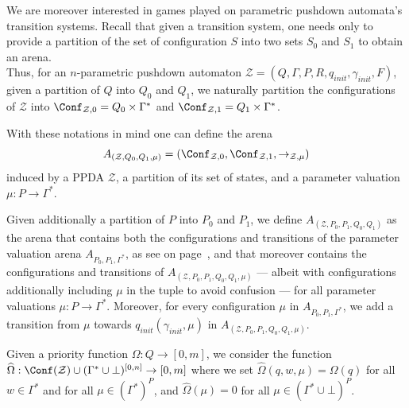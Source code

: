 We are moreover interested in games played on parametric pushdown automata's  
 transition systems.
Recall that given a 
transition system,
one needs only to provide %
a partition of the set of configuration $S$ into two sets $S_0$ and $S_1$ to obtain an arena. \\


Thus, for an  $n$-parametric pushdown automaton 
$\mathcal{Z}= (Q, \Gamma, P, R, q_{init}, \gamma_{init},F)$,
given a partition of
$Q$ into $Q_0$ and $Q_1$, 
we naturally partition the configurations of
 $\mathcal{Z}$
into
$\Conf_{\mathcal{Z},0}=Q_0\times \Gamma^*$
and
$\Conf_{\mathcal{Z},1}=Q_1\times \Gamma^*$. 


With these notations in mind one can define the arena
$$
A_{(\mathcal{Z}, Q_0, Q_1, \mu)}
=
(\Conf_{\mathcal{Z},0}, \Conf_{\mathcal{Z},1}, \rightarrow_{\mathcal{Z},\mu})$$
induced by a PPDA $\mathcal{Z}$, a partition of its set of states, and a
parameter valuation $\mu: P\rightarrow \Gamma^*$.



Given additionally a partition of
$P$ into $P_0$ and $P_1$, 
we define 
$A_{(\mathcal{Z}, P_0, P_1, Q_0 , Q_1)}$
as
the arena that contains both the configurations and transitions of
the parameter valuation arena
$A_{P_0,P_1,\Gamma^*}$, as see on page~\pageref{parametric arena},
and that moreover contains the configurations and transitions of
$A_{(\mathcal{Z}, P_0, P_1, Q_0 , Q_1, \mu)}$ 
\---- albeit with configurations additionally including $\mu$ in the tuple to avoid confusion \----
for
all parameter valuations $\mu: P\rightarrow \Gamma^*$.
Moreover, for every configuration $\mu$ in $A_{P_0,P_1,\Gamma^*}$,
we add a transition
from $\mu$ towards 
$q_{init}(\gamma_{init}, \mu)$ in $A_{(\mathcal{Z}, P_0, P_1, Q_0 , Q_1, \mu)}$. \label{PPDA reachability game}




Given a 
priority function $\Omega: Q \to [0, m]$,
we consider the function
$\widehat{\Omega}: \Conf(\mathcal{Z}) \cup (\Gamma^* \cup \bot)^{[0,n]} \to [0, m]$
where we set
$\widehat{\Omega}(q, w, \mu) = \Omega(q)$
for all
$w \in \Gamma^*$
and
for all $\mu \in (\Gamma^*)^{P}$,
and
$\widehat{\Omega}(\mu) = 0$
for all $\mu \in (\Gamma^* \cup \bot)^{P}$.

